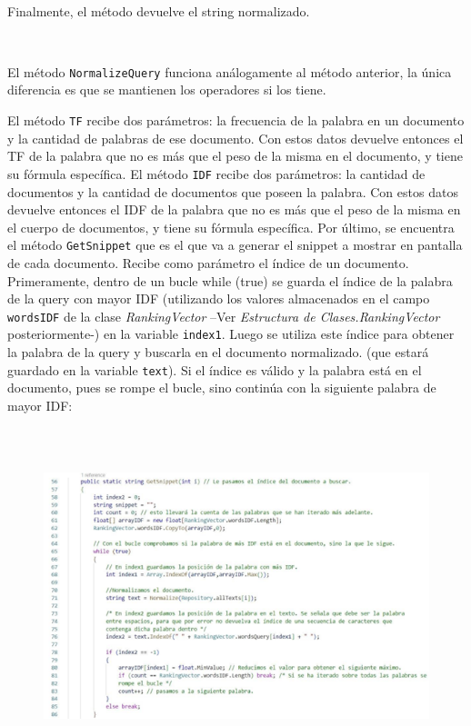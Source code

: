 \documentclass{article}
\begin{document}
\


Finalmente, el método devuelve el string normalizado.


\


El método {\texttt{NormalizeQuery}} funciona análogamente al método anterior, la única diferencia es
que se mantienen los operadores si los tiene.


El método {\texttt{TF}} recibe dos parámetros: la frecuencia de la palabra en un documento y la cantidad
de palabras de ese documento. Con estos datos devuelve entonces el TF de la palabra que no
es más que el peso de la misma en el documento, y tiene su fórmula específica.
El método {\texttt{IDF}} recibe dos parámetros: la cantidad de documentos y la cantidad de documentos
que poseen la palabra. Con estos datos devuelve entonces el IDF de la palabra que no es más
que el peso de la misma en el cuerpo de documentos, y tiene su fórmula específica.
Por último, se encuentra el método {\texttt{GetSnippet}} que es el que va a generar el snippet a mostrar
en pantalla de cada documento. Recibe como parámetro el índice de un documento.
Primeramente, dentro de un bucle while (true) se guarda el índice de la palabra de la query con
mayor IDF (utilizando los valores almacenados en el campo {\texttt{wordsIDF}} de la clase
{\textit{RankingVector}} –Ver {\textit{Estructura de Clases.RankingVector}} posteriormente-) en la variable {\texttt{index1}}. Luego se
utiliza este índice para obtener la palabra de la query y buscarla en el documento normalizado.
(que estará guardado en la variable {\texttt{text}}). Si el índice es válido y la palabra está en el
documento, pues se rompe el bucle, sino continúa con la siguiente palabra de mayor IDF:


\


\begin{figure}[h]
	\begin{center}
		\includegraphics[width = 13cm, height = 8cm]{img4.png}
	\end{center}
\end{figure}
\end{document}
